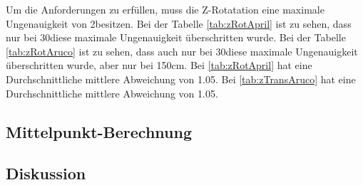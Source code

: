 Um die Anforderungen zu erfüllen, muss die Z-Rotatation eine maximale Ungenauigkeit von 2\degree besitzen.
Bei der Tabelle \ref{tab:zRotApril} ist zu sehen, dass nur bei 30\degree diese maximale Ungenauigkeit überschritten wurde.
Bei der Tabelle \ref{tab:zRotAruco} ist zu sehen, dass auch nur bei 30\degree diese maximale Ungenauigkeit überschritten wurde, aber nur bei 150cm.
Bei \ref{tab:zRotApril} hat eine Durchschnittliche mittlere Abweichung von 1.05\degree. 
Bei \ref{tab:zTransAruco} hat eine Durchschnittliche mittlere Abweichung von 1.05\degree.



\subsection{Mittelpunkt-Berechnung}

\subsection{Diskussion}